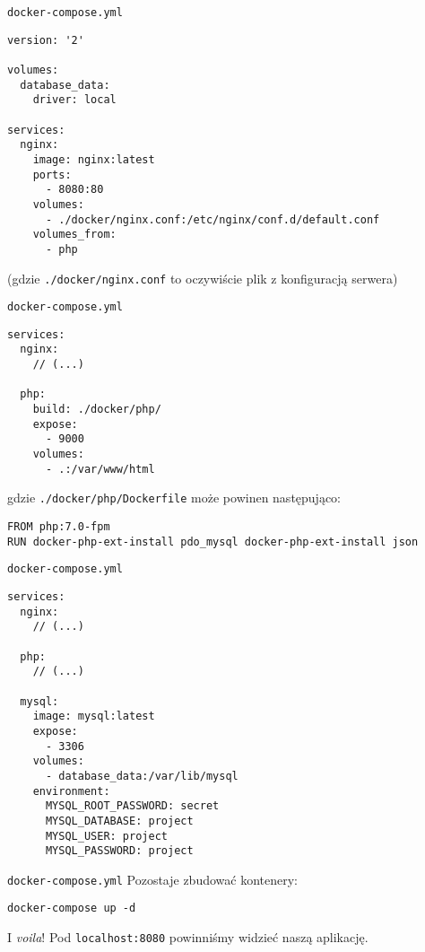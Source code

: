 \begin{frame}[fragile]{\texttt{docker-compose.yml}}
	\begin{lstlisting}
version: '2'

volumes:
  database_data:
    driver: local

services:
  nginx:
    image: nginx:latest
    ports:
      - 8080:80
    volumes:
      - ./docker/nginx.conf:/etc/nginx/conf.d/default.conf
    volumes_from:
      - php
	\end{lstlisting}
	
	(gdzie \texttt{./docker/nginx.conf} to oczywiście plik z konfiguracją serwera)
\end{frame}

\begin{frame}[fragile]{\texttt{docker-compose.yml}}
	\begin{lstlisting}
services:
  nginx:
    // (...)
  
  php:
    build: ./docker/php/
    expose:
      - 9000
    volumes:
      - .:/var/www/html
	\end{lstlisting}
	
	gdzie \texttt{./docker/php/Dockerfile} może powinen następująco:
	\begin{lstlisting}
FROM php:7.0-fpm
RUN docker-php-ext-install pdo_mysql docker-php-ext-install json
\end{lstlisting}
\end{frame}

\begin{frame}[fragile]{\texttt{docker-compose.yml}}
	\begin{lstlisting}
services:
  nginx:
    // (...)
  
  php:
    // (...)

  mysql:
    image: mysql:latest
    expose:
      - 3306
    volumes:
      - database_data:/var/lib/mysql
    environment:
      MYSQL_ROOT_PASSWORD: secret
      MYSQL_DATABASE: project
      MYSQL_USER: project
      MYSQL_PASSWORD: project
	\end{lstlisting}
\end{frame}

\begin{frame}[fragile]{\texttt{docker-compose.yml}}
	Pozostaje zbudować kontenery:
	
	\texttt{docker-compose up -d}
	
	I \emph{voila}! Pod \texttt{localhost:8080} powinniśmy widzieć naszą aplikację.
\end{frame}

